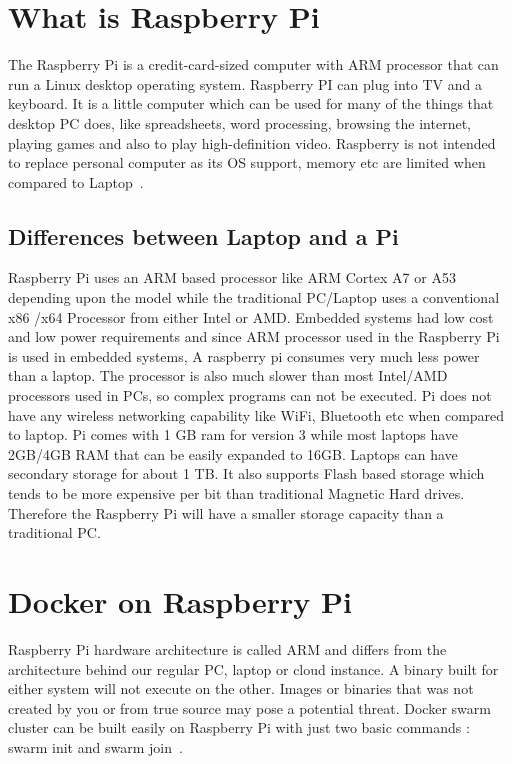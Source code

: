 \section{What is Raspberry Pi}

The Raspberry Pi is a credit-card-sized computer with ARM processor
that can run a Linux desktop operating system.  Raspberry PI can plug
into TV and a keyboard. It is a little computer which can be used for
many of the things that desktop PC does, like spreadsheets, word
processing, browsing the internet, playing games and also to play
high-definition video. Raspberry is not intended to replace personal
computer as its OS support, memory etc are limited when compared to
Laptop~\cite{Rpi}.
	
\subsection{Differences between Laptop and a Pi}

Raspberry Pi uses an ARM based processor like ARM Cortex A7 or A53
depending upon the model while the traditional PC/Laptop uses a
conventional x86 /x64 Processor from either Intel or AMD. Embedded
systems had low cost and low power requirements and since ARM
processor used in the Raspberry Pi is used in embedded systems, A
raspberry pi consumes very much less power than a laptop. The
processor is also much slower than most Intel/AMD processors used in
PCs, so complex programs can not be executed. Pi does not have any
wireless networking capability like WiFi, Bluetooth etc when compared
to laptop.  Pi comes with 1 GB ram for version 3 while most laptops
have 2GB/4GB RAM that can be easily expanded to 16GB. Laptops can have
secondary storage for about 1 TB. It also supports Flash based storage
which tends to be more expensive per bit than traditional Magnetic
Hard drives. Therefore the Raspberry Pi will have a smaller storage
capacity than a traditional PC.
    
\section{Docker on Raspberry Pi}

Raspberry Pi hardware architecture is called ARM and differs from the
architecture behind our regular PC, laptop or cloud instance. A binary
built for either system will not execute on the other. Images or
binaries that was not created by you or from true source may pose a
potential threat.  Docker swarm cluster can be built easily on
Raspberry Pi with just two basic commands : swarm init and swarm
join~\cite{dockrpi}.

